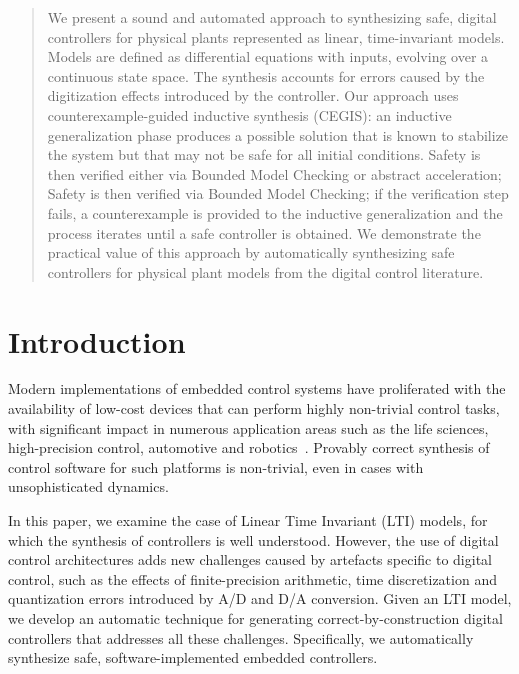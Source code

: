 \documentclass[twocolumn]{autart}    %
\begin{document}
\begin{frontmatter}
\begin{abstract}                          %
We present a sound and automated approach to synthesizing safe,
digital controllers for physical plants represented as linear,
time-invariant models. Models are defined as differential equations
with inputs, evolving over a continuous state space. The synthesis
accounts for errors caused by the digitization effects introduced by
the controller. Our approach uses counterexample-guided inductive
synthesis (CEGIS): an inductive generalization phase produces a
possible solution that is known to stabilize the system but that may
not be safe for all initial conditions. 
\ifx\axelerator
Safety is then verified either
via Bounded Model Checking or abstract acceleration;
\else
Safety is then verified via Bounded Model Checking;
\fi 
if the verification step fails, a
counterexample is provided to the inductive generalization and the
process iterates until a safe controller is obtained.  We demonstrate
the practical value of this approach by automatically synthesizing
safe controllers for physical plant models from the digital control
literature.
\end{abstract}

\end{frontmatter}

\section{Introduction}

Modern implementations of embedded control systems have proliferated
with the availability of low-cost devices that can perform highly
non-trivial control tasks, with significant impact in numerous
application areas such as the life sciences, high-precision control, 
automotive and robotics~\cite{astrom1997computer, Franklin15}.  
Provably correct synthesis of control software for such platforms is non-trivial, 
even in cases with unsophisticated dynamics. 

In this paper, we examine the case of Linear Time Invariant (LTI)
models, for which the synthesis of controllers is well understood.
However, the use of digital control architectures adds new challenges
caused by artefacts specific to digital control, such as the effects
of finite-precision arithmetic, time discretization and quantization
errors introduced by A/D and D/A conversion.
%
Given an LTI model, we develop an automatic technique for generating
correct-by-construction digital controllers that addresses all these
challenges. Specifically, we automatically synthesize %
safe,
software-implemented embedded controllers.  
\end{document}
